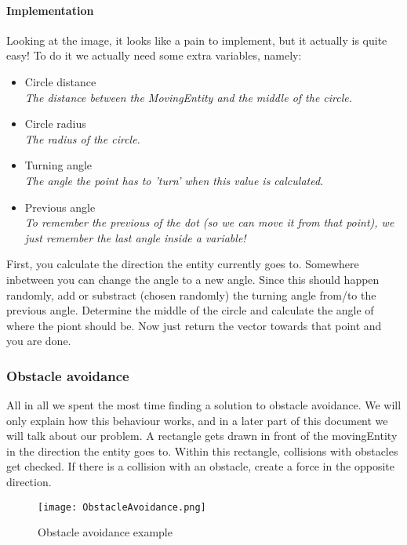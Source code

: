 \paragraph{Implementation}
Looking at the image, it looks like a pain to implement, but it actually is quite easy!
To do it we actually need some extra variables, namely:
\begin{itemize}
    \item Circle distance
    \\\textit{The distance between the MovingEntity and the middle of the circle.}
    \item Circle radius
    \\\textit{The radius of the circle.}
    \item Turning angle
    \\\textit{The angle the point has to 'turn' when this value is calculated.}
    \item Previous angle
    \\\textit{To remember the previous of the dot (so we can move it from that point), we just remember the last angle inside a variable!}
\end{itemize}
First, you calculate the direction the entity currently goes to.
Somewhere inbetween you can change the angle to a new angle.
Since this should happen randomly, add or substract (chosen randomly) the turning angle from/to the previous angle.
Determine the middle of the circle and calculate the angle of where the piont should be.
Now just return the vector towards that point and you are done.
\subsubsection{Obstacle avoidance}\label{sec:ObstacleAvoidance}
All in all we spent the most time finding a solution to obstacle avoidance.
We will only explain how this behaviour works, and in a later part of this document we will talk about our problem.
A rectangle gets drawn in front of the movingEntity in the direction the entity goes to.
Within this rectangle, collisions with obstacles get checked.
If there is a collision with an obstacle, create a force in the opposite direction.
\begin{figure}[h!]
    \begin{center}
        \texttt{[image: ObstacleAvoidance.png]}
    \end{center}
    \caption{Obstacle avoidance example}
    \label{fig:ObstacleAvoidanceExplanation}
\end{figure}
